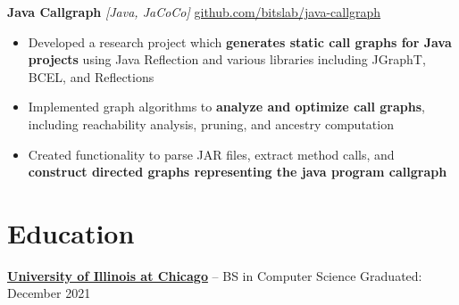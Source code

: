 \documentclass[10pt]{article}
\begin{document}
\textbf{Java Callgraph} \textit{[Java, JaCoCo]} \hfill \href{https://github.com/bitslab/java-callgraph}{github.com/bitslab/java-callgraph}
\vspace{-4pt}
\begin{itemize}
  \item Developed a research project which \textbf{generates static call graphs for Java projects} using Java Reflection and various libraries including JGraphT, BCEL, and Reflections
  \item Implemented graph algorithms to \textbf{analyze and optimize call graphs}, including reachability analysis, pruning, and ancestry computation
  \item Created functionality to parse JAR files, extract method calls, and \textbf{construct directed graphs representing the java program callgraph}
\end{itemize}

\vspace{5pt}

\section*{Education}
\vspace{4pt}
\textbf{\href{https://www.uic.edu/}{University of Illinois at Chicago}} -- BS in Computer Science \hfill Graduated: December 2021
\end{document}
